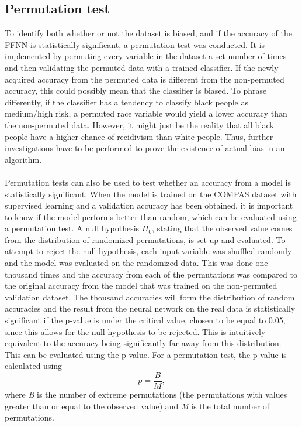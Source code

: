 \documentclass[11pt, fleqn, titlepage]{article}
\begin{document}
	\subsection{Permutation test}
	To identify both whether or not the dataset is biased, and if the accuracy of the FFNN is statistically significant, a permutation test was conducted. It is implemented by permuting every variable in the dataset a set number of times and then validating the permuted data with a trained classifier. If the newly acquired accuracy from the permuted data is different from the non-permuted accuracy, this could possibly mean that the classifier is biased. To phrase differently, if the classifier has a tendency to classify black people as medium/high risk, a permuted race variable would yield a lower accuracy than the non-permuted data. However, it might just be the reality that all black people have a higher chance of recidivism than white people. Thus, further investigations have to be performed to prove the existence of actual bias in an algorithm. \\\\
	Permutation tests can also be used to test whether an accuracy from a model is statistically significant. When the model is trained on the COMPAS dataset with supervised learning and a validation accuracy has been obtained, it is important to know if the model performs better than random, which can be evaluated using a permutation test. A null hypothesis $H_{0}$, stating that the observed value comes from the distribution of randomized permutations, is set up and evaluated. To attempt to reject the null hypothesis, each input variable was shuffled randomly and the model was evaluated on the randomized data. This was done one thousand times and the accuracy from each of the permutations was compared to the original accuracy from the model that was trained on the non-permuted validation dataset. The thousand accuracies will form the distribution of random accuracies and the result from the neural network on the real data is statistically significant if the p-value is under the critical value, chosen to be equal to 0.05, since this allows for the null hypothesis to be rejected. This is intuitively equivalent to the accuracy being significantly far away from this distribution. 
	 This can be evaluated using the p-value. For a permutation test, the p-value is calculated using 
	\[p=\frac{B}{M},\]
	where \textit{B} is the number of extreme permutations (the permutations with values greater than or equal to the observed value) and \textit{M} is the total number of permutations. 
	
\end{document}

